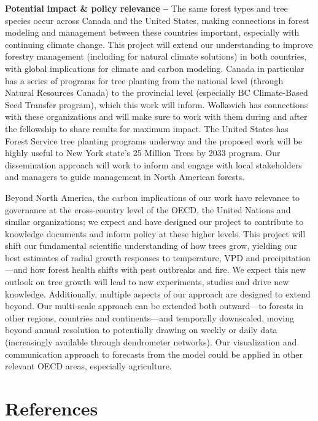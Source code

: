 \documentclass[11pt]{article}
\begin{document}
{\bf Potential impact \& policy relevance --} %
The same forest types and tree species occur across Canada and the United States, making connections in forest modeling and management between these countries important, especially with continuing climate change. This project will extend our understanding to improve forestry management (including for natural climate solutions) in both countries, with global implications for climate and carbon modeling. Canada in particular has a series of programs for tree planting from the national level (through Natural Resources Canada) to the provincial level (especially BC Climate-Based Seed Transfer program),  which this work will inform. Wolkovich has connections with these organizations and will make sure to work with them during and after the fellowship to share results for maximum impact. The United States has Forest Service tree planting programs underway and the proposed work will be highly useful to New York state's 25 Million Trees by 2033 program. Our dissemination approach will work to inform and engage with  local stakeholders and managers to guide management in North American forests. 

Beyond North America, the carbon implications of our work have relevance to governance at the cross-country level of the OECD, the United Nations and similar organizations; we expect and have designed our project to contribute to knowledge documents and inform policy at these higher levels. 
This project will shift our fundamental scientific understanding of how trees grow, yielding our best estimates of radial growth responses to temperature, VPD and precipitation---and how forest health shifts with pest outbreaks and fire. We expect this new outlook on tree growth will lead to new experiments, studies and drive new knowledge. Additionally, multiple aspects of our approach are designed to extend beyond. Our multi-scale approach can be extended both outward---to forests in other regions, countries and continents---and temporally downscaled, moving beyond annual resolution to potentially drawing on weekly or daily data (increasingly available through dendrometer networks). Our visualization and communication approach to forecasts from the model could be applied in other relevant OECD areas, especially agriculture. %



\section*{References}
\def\section*#1{}

\end{document}
